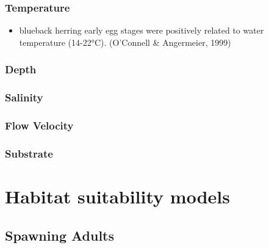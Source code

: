 \documentclass[
]{book}
\providecommand{\tightlist}{%
  \setlength{\itemsep}{0pt}\setlength{\parskip}{0pt}}
\begin{document}
\hypertarget{temperature-8}{%
\subsubsection{Temperature}\label{temperature-8}}

\begin{itemize}
\tightlist
\item
  blueback herring early egg stages were positively related to water temperature (14-22°C). (O'Connell \& Angermeier, 1999)
\end{itemize}

\hypertarget{depth-8}{%
\subsubsection{Depth}\label{depth-8}}

\hypertarget{salinity-8}{%
\subsubsection{Salinity}\label{salinity-8}}

\hypertarget{flow-velocity-8}{%
\subsubsection{Flow Velocity}\label{flow-velocity-8}}

\hypertarget{substrate-8}{%
\subsubsection{Substrate}\label{substrate-8}}

\hypertarget{habitat-suitability-models-1}{%
\section{Habitat suitability models}\label{habitat-suitability-models-1}}

\hypertarget{spawning-adults-1}{%
\subsection{Spawning Adults}\label{spawning-adults-1}}
\end{document}
